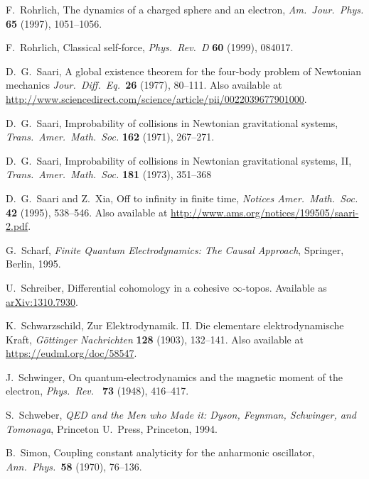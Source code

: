 \documentclass[12pt]{article}
\begin{document}
\begin{thebibliography}{10}
 F.\ Rohrlich, The dynamics of a charged sphere and an electron,
\textsl{Am.\ Jour.\ Phys.} {\bf 65} (1997), 1051--1056.

 F.\ Rohrlich, Classical self-force, \textsl{Phys.\ Rev.\ D} {\bf 60} (1999), 084017.

 D.\ G.\ Saari, A global existence theorem for the four-body problem of Newtonian mechanics  \textsl{Jour.\ Diff.\ Eq.\ }{\bf 26} (1977), 80--111.  Also available
at \href{http://www.sciencedirect.com/science/article/pii/0022039677901000}{http://www.sciencedirect.com/science/article/pii/0022039677901000}.

 D.\ G.\ Saari,  Improbability of collisions in Newtonian gravitational systems, \textsl{Trans.\ Amer.\ Math.\ Soc.} \textbf{162} (1971), 267--271.

 D.\ G.\ Saari, Improbability of collisions in Newtonian gravitational systems, II, \textsl{Trans.\ Amer.\ Math.\ Soc.} \textbf{181} (1973), 351--368 

 D.\ G.\ Saari and Z.\ Xia, Off to infinity in finite time,
\textsl{Notices Amer.\ Math.\ Soc.} \textbf{42} (1995), 538--546.  Also available at 
\href{http://www.ams.org/notices/199505/saari-2.pdf}{http://www.ams.org/\break notices/199505/saari-2.pdf}.

 G.\ Scharf, \textsl{Finite Quantum Electrodynamics: The Causal Approach}, Springer, Berlin, 1995.  

 U.\ Schreiber, Differential cohomology in a cohesive $\infty$-topos.  Available as \href{http://arxiv.org/abs/1310.7930}{arXiv:1310.7930}. 

 K.\ Schwarzschild, Zur Elektrodynamik. II. Die elementare elektrodynamische Kraft, \textsl{G\"ottinger Nachrichten} \textbf{128} (1903), 132--141.  Also available at \href{https://eudml.org/doc/58547}{https://eudml.org/doc/58547}.

 J.\ Schwinger, On quantum-electrodynamics and the magnetic moment of the electron, \textsl{Phys.\ Rev.\ } \textbf{73} (1948), 416--417.  

 S.\ Schweber, \textsl{QED and the Men who Made it: Dyson, Feynman, Schwinger, and Tomonaga}, Princeton U.\ Press, Princeton, 1994.
 
 B.\ Simon, Coupling constant analyticity for the anharmonic oscillator, \textsl{Ann.\ Phys.\ }\textbf{58} (1970), 76--136. 


\end{thebibliography}
\end{document}
